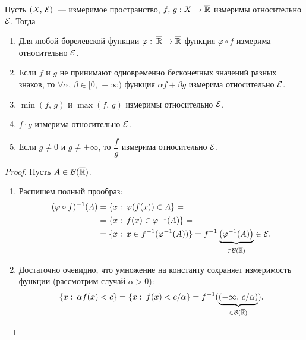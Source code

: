 \begin{claim}
    Пусть $(X,\, \mathcal{E})$~--- измеримое пространство, $f,\, g: X\to\overline{\mathbb{R}}$ измеримы относительно $\mathcal{E}$. Тогда
    \begin{enumerate}
        \item Для любой борелевской функции $\varphi:\:\overline{\mathbb{R}}\to\overline{\mathbb{R}}$ функция $\varphi\circ f$ измерима относительно $\mathcal{E}$.
        \item Если $f$ и $g$ не принимают одновременно бесконечных значений разных знаков, то
              $\forall \alpha,\, \beta\in [0,\, +\infty)$ функция $\alpha f+\beta g$ измерима относительно $\mathcal{E}$.
        \item $\min(f,\, g)$ и $\max(f,\, g)$ измеримы относительно $\mathcal{E}$.
        \item $f\cdot g$ измерима относительно $\mathcal{E}$.
        \item Если $g\neq 0$ и $g\neq\pm\infty$, то $\dfrac{f}{g}$ измерима относительно $\mathcal{E}$.
    \end{enumerate}

    \begin{proof}

        Пусть $A\in\mathcal{B}(\overline{\mathbb{R}})$.

        \begin{enumerate}
            \item Распишем полный прообраз:
                  \begin{align*}
                      (\varphi\circ f)^{-1}(A) & =\{x:\: \varphi(f(x))\in A\}=                                                                               \\
                                               & =\{x:\: f(x)\in\varphi^{-1}(A)\}=                                                                           \\
                                               & =\{x:\: x\in f^{-1}(\varphi^{-1}(A))\}=f^{-1}\underbrace{\left(\varphi^{-1}(A)\right)}_{\in\mathcal{B}(\overline{\mathbb{R}})}\in\mathcal{E}. \\
                  \end{align*}
            \item Достаточно очевидно, что умножение на константу сохраняет измеримость функции (рассмотрим случай $\alpha>0$):
                  \[
                      \{x:\: \alpha f(x)<c\}=\{x:\: f(x)< c/\alpha\}=f^{-1}(\underbrace{(-\infty,\, c/\alpha)}_{\in\mathcal{B}(\overline{\mathbb{R}})}).
                  \]


\end{enumerate}
\end{proof}
\end{claim}
